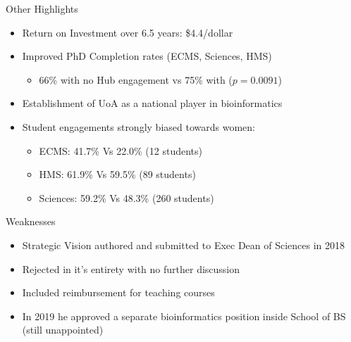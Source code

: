 \documentclass[11pt]{beamer}
\begin{document}
\begin{frame}{Other Highlights}

	\begin{itemize}
		\item Return on Investment over 6.5 years: \$4.4/dollar
		\item Improved PhD Completion rates (ECMS, Sciences, HMS)
		\begin{itemize}
			\item 66\% with no Hub engagement vs 75\% with ($p = 0.0091$)
		\end{itemize}	
		\item Establishment of UoA as a national player in bioinformatics
		\item Student engagements strongly biased towards women:
		\begin{itemize}
			\item ECMS: 41.7\% Vs 22.0\% (12 students)
			\item HMS: 61.9\% Vs 59.5\% (89 students)
			\item Sciences: 59.2\% Vs 48.3\% (260 students)\\[1cm]
		\end{itemize}
	\end{itemize}

\end{frame}

\begin{frame}{Weaknesses}

	\begin{itemize}
		\item Strategic Vision authored and submitted to Exec Dean of Sciences in 2018
		\item Rejected in it's entirety with no further discussion
		\item Included reimbursement for teaching courses
		\item In 2019 he approved a separate bioinformatics position inside School of BS (still unappointed)\\[1cm]

	\end{itemize}

\end{frame}
\end{document}
